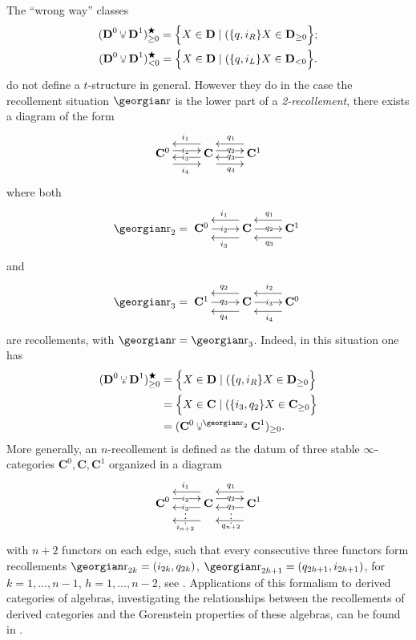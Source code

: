 \begin{remark}
The ``wrong way'' classes
\begin{gather}
(\D^0\glue \D^1)^\bigstar_{\ge 0} = \Big\{ X\in\D\mid (\{q,i_R\} X\in \D_{\ge 0} \Big\};\notag \\
(\D^0\glue \D^1)^\bigstar_{<0} = \Big\{ X\in\D\mid (\{q,i_L\} X\in \D_{< 0}  \Big\}.
\end{gather}
do not define a $t$\hyp{}structure in general. However they do in the case the recollement situation $\rec$ is the lower part of a \emph{2-recollement}, \ie there exists a diagram of the form
\[ 
\xymatrix{
  \mathbf{C}^0  & \mathbf{C}  & \mathbf{C}^1
  \ar@{<-}@<9pt> "1,1";"1,2" ^{i_1}
  \ar@<3pt> "1,1";"1,2" |{i_2}
  \ar@{<-}@<-3pt> "1,1";"1,2" |{i_3}
  \ar@<-9pt> "1,1";"1,2" _{i_4}
  \ar@{<-}@<9pt> "1,2";"1,3" ^{q_1}
  \ar@<3pt> "1,2";"1,3" |{q_2}
  \ar@{<-}@<-3pt> "1,2";"1,3" |{q_3}
  \ar@<-9pt> "1,2";"1,3" _{q_4}
}
\]
where both
\[
\rec_2=\xymatrix{
  \mathbf{C}^0  &\mathbf{C} & \mathbf{C}^1
  \ar|{i_2} "1,1";"1,2" 
  \ar@<8pt>^{i_3} "1,2";"1,1" 
  \ar@<-8pt>_{i_1} "1,2";"1,1" 
  \ar|{q_2} "1,2";"1,3" 
  \ar@<8pt>^{q_3} "1,3";"1,2" 
  \ar@<-8pt>_{q_1} "1,3";"1,2" 
}
\]
and
\[
\rec_3=\xymatrix{
 \mathbf{C}^1 & \mathbf{C}  & \mathbf{C}^0
  \ar|{q_3} "1,1";"1,2" 
  \ar@<8pt>^{q_4} "1,2";"1,1" 
  \ar@<-8pt>_{q_2} "1,2";"1,1" 
  \ar|{i_3} "1,2";"1,3" 
  \ar@<8pt>^{i_4} "1,3";"1,2" 
  \ar@<-8pt>_{i_2} "1,3";"1,2" 
}
\]
are recollements, with $\rec=\rec_3$. Indeed, in this situation one has
\begin{align*}
(\D^0\glue \D^1)^\bigstar_{\ge 0} &= \Big\{ X\in\D\mid (\{q,i_R\} X\in \D_{\ge 0} \Big\}\\
&= \Big\{ X\in\mathbf{C}\mid (\{i_3,q_2\} X\in \mathbf{C}_{\ge 0} \Big\}\\
&=(\mathbf{C}^0\glue^{\rec_2} \mathbf{C}^1)_{\ge 0}.
\end{align*}
More generally, an $n$\hyp{}recollement is defined as the datum of three stable $\infty$\hyp{}categories $\mathbf{C}^0, \mathbf{C}, \mathbf{C}^1$ organized in a diagram
\[\label{diag:nreco}
  \xymatrix{
    \CC^0  & \CC  & \CC^1
    \ar@<5pt> "1,1";"1,2" |{i_2}
    \ar@{<-}@<11pt> "1,1";"1,2" ^{i_1}
    \ar@{<-}@<-3pt> "1,1";"1,2" |{i_3}
    \ar@<-10pt>@{}|\vdots "1,1";"1,2" 
    \ar@{<-}@<-15pt> "1,1";"1,2" _{i_{n+2}}
    \ar@<5pt> "1,2";"1,3" |{q_2}
    \ar@{<-}@<11pt> "1,2";"1,3" ^{q_1}
    \ar@{<-}@<-3pt> "1,2";"1,3" |{q_3}
    \ar@<-10pt>@{}|\vdots "1,2";"1,3" 
    \ar@{<-}@<-15pt> "1,2";"1,3" _{q_{n+2}}
  }
\]with $n+2$ functors on each edge, such that every consecutive three functors form recollements  $\rec_{2k} = (i_{2k}, q_{2k})$, $\rec_{2h+1} = (q_{2h+1}, i_{2h+1})$, for $k=1, \dots, n-1$, $h=1, \dots, n-2$, see \cite[Def. \textbf{2}]{nrecol1}.  Applications of this formalism to derived categories of algebras, investigating the relationships between the recollements of derived categories
and the Gorenstein properties of these algebras, can be found in \cite{nrecol1,nrecol2}.
\end{remark}


